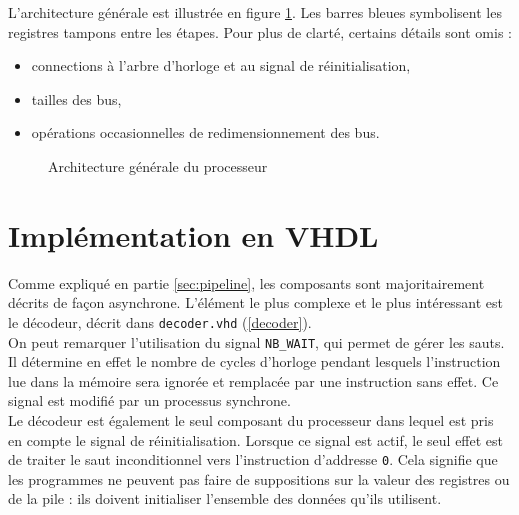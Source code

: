 L'architecture générale est illustrée en figure \ref{fig:architecture}. Les
barres bleues symbolisent les registres tampons entre les étapes. Pour plus de
clarté, certains détails sont omis :
\begin{itemize}
\item connections à l'arbre d'horloge et au signal de réinitialisation,
\item tailles des bus,
\item opérations occasionnelles de redimensionnement des bus.
\end{itemize}

\begin{landscape}
\begin{figure}[!h]
    \centering
    
    \caption{Architecture générale du processeur}
    \label{fig:architecture}
\end{figure}
\end{landscape}

\section{Implémentation en VHDL}

Comme expliqué en partie \ref{sec:pipeline}, les composants sont majoritairement
décrits de façon asynchrone. L'élément le plus complexe et le plus intéressant
est le décodeur, décrit dans \texttt{decoder.vhd} (\ref{decoder}). \\



On peut remarquer l'utilisation du signal \texttt{NB\_WAIT}, qui permet de gérer
les sauts. Il détermine en effet le nombre de cycles d'horloge pendant lesquels
l'instruction lue dans la mémoire sera ignorée et remplacée par une instruction
sans effet. Ce signal est modifié par un processus synchrone. \\

Le décodeur est également le seul composant du processeur dans lequel est pris
en compte le signal de réinitialisation. Lorsque ce signal est actif, le seul
effet est de traiter le saut inconditionnel vers l'instruction d'addresse
\texttt{0}. Cela signifie que les programmes ne peuvent pas faire de
suppositions sur la valeur des registres ou de la pile : ils doivent initialiser
l'ensemble des données qu'ils utilisent.
